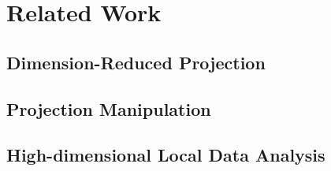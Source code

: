 \section{Related Work}
\subsection{Dimension-Reduced Projection}
\subsection{Projection Manipulation}
\cite{DBLP:journals/tvcg/LehmannT13}
\subsection{High-dimensional Local Data Analysis}

 \cite{DBLP:journals/cgf/SipsNLH09} \cite{jeong2009ipca} \cite{DBLP:journals/tvcg/YuanRWG13} \cite{DBLP:journals/tvcg/NamM13} \cite{DBLP:journals/tvcg/HuBMHNL13} \cite{DBLP:journals/tvcg/ElmqvistDF08} \cite{DBLP:journals/tc/FriedmanT74} \cite{DBLP:journals/ivs/SeoS05} \cite{DBLP:journals/cgf/SipsNLH09} \cite{absil2004riemannian}